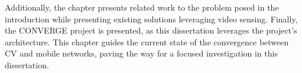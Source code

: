 Additionally, the chapter presents related work to the problem posed in the introduction while presenting existing solutions leveraging video sensing.
Finally, the CONVERGE project is presented, as this dissertation leverages the project's architecture.
This chapter guides the current state of the convergence between CV and mobile networks, paving the way for a focused investigation in this dissertation.




